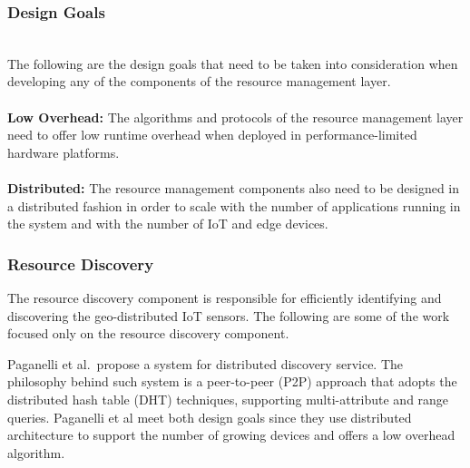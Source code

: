 \subsubsection{Design Goals}
\hfill\\
The following are the design goals that need to be taken into consideration when developing any of the components of the resource management layer.
\\\\
\textbf{Low Overhead:} The algorithms and protocols of the resource management layer need to offer low runtime overhead when deployed in performance-limited hardware platforms.
\\\\
\textbf{Distributed:} The resource management components also need to be designed in a distributed fashion in order to scale with the number of applications running in the system and with the number of IoT and edge devices.




\subsubsection{Resource Discovery}
The resource discovery component is responsible for efficiently identifying and discovering the geo-distributed IoT sensors. 
The following are some of the work focused only on the resource discovery component. 

Paganelli et al.~\cite{article}propose a system for distributed discovery service. The philosophy behind such system is a peer-to-peer (P2P) approach that adopts the distributed hash table (DHT) techniques, supporting multi-attribute and range queries. Paganelli et al meet both design goals since they use distributed architecture to support the number of growing devices and offers a low overhead algorithm.

